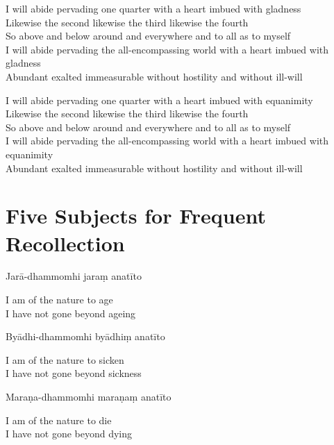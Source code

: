 I will abide pervading one quarter with a heart imbued with gladness\\
Likewise the second likewise the third likewise the fourth\\
So above and below around and everywhere and to all as to myself\\
I will abide pervading the all-encompassing world with a heart imbued with gladness\\
Abundant exalted immeasurable without hostility and without ill-will

I will abide pervading one quarter with a heart imbued with equanimity\\
Likewise the second likewise the third likewise the fourth\\
So above and below around and everywhere and to all as to myself\\
I will abide pervading the all-encompassing world with a heart imbued with equanimity\\
Abundant exalted immeasurable without hostility and without ill-will


\clearpage

\section{Five Subjects for Frequent Recollection}

\begin{leader}
\end{leader}

Jarā-dhammomhi jaraṃ anatīto

\begin{english}
  I am of the nature to age\\
  I have not gone beyond ageing
\end{english}

Byādhi-dhammomhi byādhiṃ anatīto

\begin{english}
  I am of the nature to sicken\\
  I have not gone beyond sickness
\end{english}

Maraṇa-dhammomhi maraṇaṃ anatīto

\begin{english}
  I am of the nature to die\\
  I have not gone beyond dying
\end{english}

